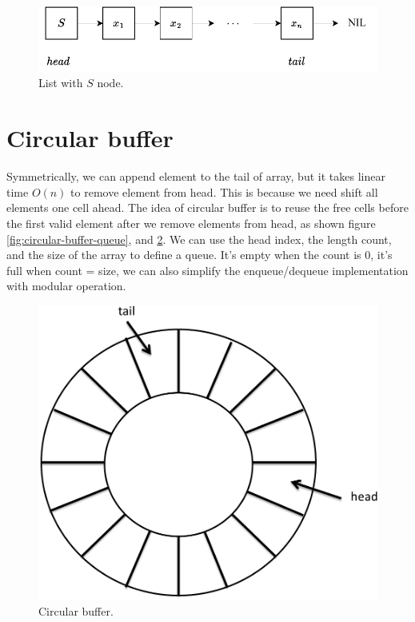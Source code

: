 \documentclass[b5paper]{article}
\begin{document}
\begin{figure}[htbp]
  \centering
  \includegraphics[scale=0.8]{img/slistq}
  \caption{List with $S$ node.}
  \label{fig:list-queue}
\end{figure}

\section{Circular buffer}

Symmetrically, we can append element to the tail of array, but it takes linear time $O(n)$ to remove element from head. This is because we need shift all elements one cell ahead. The idea of circular buffer is to reuse the free cells before the first valid element after we remove elements from head, as shown figure \ref{fig:circular-buffer-queue}, and \ref{fig:circular-buffer}. We can use the head index, the length count, and the size of the array to define a queue. It's empty when the count is 0, it's full when count = size, we can also simplify the enqueue/dequeue implementation with modular operation.

\begin{figure}[htbp]
 \centering
 \includegraphics[scale=0.3]{img/ring-buffer}
 \caption{Circular buffer.}
 \label{fig:circular-buffer}
\end{figure}
\end{document}

